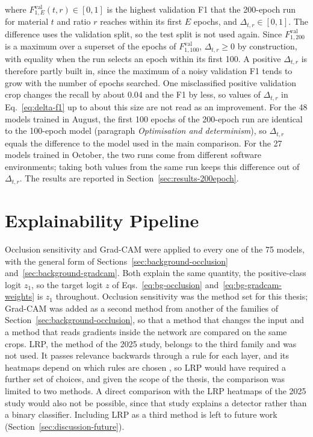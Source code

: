 where $F_{1,E}^{\mathrm{val}}(t, r) \in [0,1]$ is the highest validation F1 that the
200-epoch run for material $t$ and ratio $r$ reaches within its first $E$ epochs, and
$\Delta_{t,r} \in [0, 1]$. The difference uses the validation split, so the test split
is not used again. Since $F_{1,200}^{\mathrm{val}}$ is a maximum over a superset of the
epochs of $F_{1,100}^{\mathrm{val}}$, $\Delta_{t,r} \ge 0$ by construction, with equality
when the run selects an epoch within its first 100. A positive $\Delta_{t,r}$ is therefore
partly built in, since the maximum of a noisy validation F1 tends to grow with the number
of epochs searched. One misclassified positive validation crop changes the recall by about 0.04 and
the F1 by less, so values of
$\Delta_{t,r}$ in Eq.~\eqref{eq:delta-f1} up to about this size are not read as an improvement. For the 48 models trained in August,
the first 100 epochs of the 200-epoch run are identical to the 100-epoch model
(paragraph \emph{Optimisation and determinism}), so $\Delta_{t,r}$ equals the difference
to the model used in the main comparison. For the 27 models trained in October, the
two runs come from different software environments; taking both values from the same
run keeps this difference out of $\Delta_{t,r}$.
The results are reported in Section~\ref{sec:results-200epoch}.

\section{Explainability Pipeline}
\label{sec:methodology-explainability}

Occlusion sensitivity \citep{zeilerFergus2014} and Grad-CAM \citep{selvaraju2017gradcam}
were applied to every one of the 75 models, with the general form of
Sections~\ref{sec:background-occlusion} and~\ref{sec:background-gradcam}. Both explain
the same quantity, the positive-class logit $z_1$, so the target logit $z$ of
Eqs.~\eqref{eq:bg-occlusion} and~\eqref{eq:bg-gradcam-weights} is $z_1$ throughout.
Occlusion sensitivity was the method set for this thesis; Grad-CAM was added as a
second method from another of the families of Section~\ref{sec:background-occlusion},
so that a method that changes the input and a method that reads gradients inside the
network are compared on the same crops. LRP, the method of the 2025 study, belongs to
the third family and was not used. It passes relevance backwards through a rule for
each layer, and its heatmaps depend on which rules are chosen \citep{montavon2019lrp},
so LRP would have required a further set of choices, and given the scope of the
thesis, the comparison was limited to two methods. A direct comparison
with the LRP heatmaps of the 2025 study would also not be possible, since that study
explains a detector rather than a binary classifier. Including LRP as a third method is
left to future work (Section~\ref{sec:discussion-future}).


